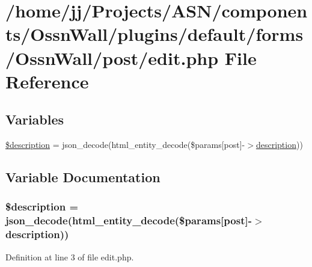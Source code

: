 \hypertarget{components_2_ossn_wall_2plugins_2default_2forms_2_ossn_wall_2post_2edit_8php}{}\section{/home/jj/\+Projects/\+A\+S\+N/components/\+Ossn\+Wall/plugins/default/forms/\+Ossn\+Wall/post/edit.php File Reference}
\label{components_2_ossn_wall_2plugins_2default_2forms_2_ossn_wall_2post_2edit_8php}
\subsection*{Variables}
\begin{DoxyCompactItemize}
\item 
\hyperlink{components_2_ossn_wall_2plugins_2default_2forms_2_ossn_wall_2post_2edit_8php_a87b032cba06009e3467abf1c8018d960}{\$description} = json\+\_\+decode(html\+\_\+entity\+\_\+decode(\$params\mbox{[}\textquotesingle{}post\textquotesingle{}\mbox{]}-\/$>$\hyperlink{components_2_ossn_wall_2actions_2wall_2post_2edit_8php_a7f60fcaa72b0968e6b6bd7d819fa6fd9}{description}))
\end{DoxyCompactItemize}


\subsection{Variable Documentation}
\subsubsection[{\texorpdfstring{\$description}{$description}}]{\setlength{\rightskip}{0pt plus 5cm}\${\bf description} = json\+\_\+decode(html\+\_\+entity\+\_\+decode(\$params\mbox{[}\textquotesingle{}post\textquotesingle{}\mbox{]}-\/$>${\bf description}))}\hypertarget{components_2_ossn_wall_2plugins_2default_2forms_2_ossn_wall_2post_2edit_8php_a87b032cba06009e3467abf1c8018d960}{}\label{components_2_ossn_wall_2plugins_2default_2forms_2_ossn_wall_2post_2edit_8php_a87b032cba06009e3467abf1c8018d960}


Definition at line 3 of file edit.\+php.

